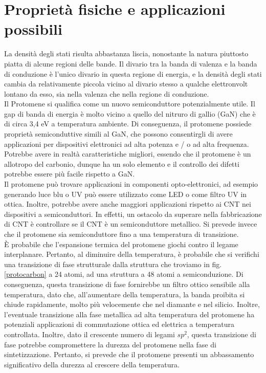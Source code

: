 \documentclass[a4paper,titlepage]{book}
\begin{document}
\section{Proprietà fisiche e applicazioni possibili}
La densità degli stati risulta abbastanza liscia, nonostante la natura piuttosto piatta di alcune regioni delle bande. Il divario tra la banda di valenza e la banda di conduzione è l'unico divario in questa regione di energia, e la densità degli stati cambia da relativamente piccola vicino al divario stesso a qualche elettronvolt lontano da esso, sia nella valenza che nella regione di conduzione. \\

Il Protomene si qualifica come un nuovo semiconduttore potenzialmente utile. Il gap di banda di energia è molto vicino a quello del nitruro di gallio (GaN) che è di circa 3,4 eV a temperatura ambiente. Di conseguenza, il protomene possiede proprietà semiconduttive simili al GaN, che possono consentirgli di avere applicazioni per dispositivi elettronici ad alta potenza e / o ad alta frequenza. Potrebbe avere in realtà caratteristiche migliori, essendo che il protomene è un allotropo del carbonio, dunque ha un solo elemento e il controllo dei difetti potrebbe essere più facile rispetto a GaN.\\
Il protomene può trovare applicazioni in componenti opto-elettronici, ad esempio generando luce blu o UV può essere utilizzato come LED o come filtro UV in ottica. Inoltre, potrebbe avere anche maggiori applicazioni rispetto ai CNT nei dispositivi a semiconduttori. In effetti, un ostacolo da superare nella fabbricazione di CNT è controllare se il CNT è un semiconduttore metallico. Si prevede invece che il protomene sia semiconduttore fino a una temperatura di transizione.\\
È probabile che l'espansione termica del protomene giochi contro il legame interplanare. Pertanto, al diminuire della temperatura, è probabile che si verifichi una transizione di fase strutturale dalla struttura che troviamo in fig. \ref{protocarbon} a 24 atomi, ad una struttura a 48 atomi a semiconduzione. Di conseguenza, questa transizione di fase fornirebbe un filtro ottico sensibile alla temperatura, dato che, all'aumentare della temperatura, la banda proibita si chiude rapidamente, molto più velocemente che nel diamante e nel silicio. Inoltre, l'eventuale transizione alla fase metallica ad alta temperatura del protomene ha potenziali applicazioni di commutazione ottica ed elettrica a temperatura controllata. Inoltre, dato il crescente numero di legami $sp^2$, questa transizione di fase potrebbe compromettere la durezza del protomene nella fase di sintetizzazione. Pertanto, si prevede che il protomene presenti un abbassamento significativo della durezza al crescere della temperatura. \\
\end{document}
